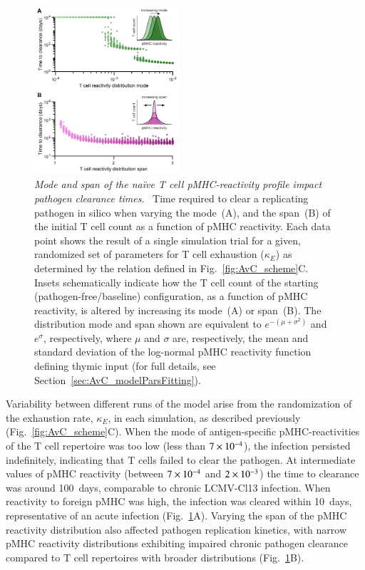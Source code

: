 \begin{figure}[t]
    \centering
    \includegraphics[width=0.48\textwidth]{Figures/AvC/fig3_distributionEffs.pdf}
    \caption[Mode and span of the naïve T cell pMHC-reactivity profile impact pathogen clearance times]{\textit{Mode and span of the naïve T cell pMHC-reactivity profile impact pathogen clearance times}. %
    ~Time required to clear a replicating pathogen in silico when varying the mode~(A), and the span~(B) of the initial T cell count as a function of pMHC reactivity. Each data point shows the result of a single simulation trial for a given, randomized set of parameters for T cell exhaustion ($\kappa_E$) as determined by the relation defined in Fig.~\ref{fig:AvC_scheme}C. Insets schematically indicate how the T cell count of the starting (pathogen-free/baseline) configuration, as a function of pMHC reactivity, is altered by increasing its mode~(A) or span~(B). The distribution mode and span shown are equivalent to $e^{-(\mu+\sigma^2 )}$ and $e^\sigma$, respectively, where $\mu$ and $\sigma$ are, respectively, the mean and standard deviation of the log-normal pMHC reactivity function defining thymic input (for full details, see Section~\ref{sec:AvC_modelParsFitting}).}
    \label{fig:AvC_dists}
\end{figure}
%
Variability between different runs of the model arise from the randomization of the exhaustion rate, $\kappa_E$, in each simulation, as described previously (Fig.~\ref{fig:AvC_scheme}C). When the mode of antigen-specific pMHC-reactivities of the T cell repertoire was too low (less than $7\times 10^{-4}$), the infection persisted indefinitely, indicating that T cells failed to clear the pathogen. At intermediate values of pMHC reactivity (between $7\times 10^{-4}$ and $2\times 10^{-3}$) the time to clearance was around 100~days, comparable to chronic LCMV-Cl13 infection. When reactivity to foreign pMHC was high, the infection was cleared within 10~days, representative of an acute infection (Fig.~\ref{fig:AvC_dists}A). Varying the span of the pMHC reactivity distribution also affected pathogen replication kinetics, with narrow pMHC reactivity distributions exhibiting impaired chronic pathogen clearance compared to T cell repertoires with broader distributions (Fig.~\ref{fig:AvC_dists}B).

